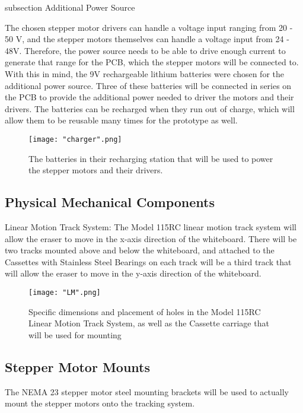 subsection {Additional Power Source}

The chosen stepper motor drivers can handle a voltage input ranging from 20 - 50 V, and the stepper motors themselves can handle a voltage input from 24 - 48V. Therefore, the power source needs to be able to drive enough current to generate that range for the PCB, which the stepper motors will be connected to. With this in mind, the 9V rechargeable lithium batteries were chosen for the additional power source. Three of these batteries will be connected in series on the PCB to provide the additional power needed to driver the motors and their drivers. The batteries can be recharged when they run out of charge, which will allow them to be reusable many times for the prototype as well.

\begin{figure}[H]
	\centering
	{\texttt{[image: "charger".png]}}
	\caption{ The batteries in their recharging station that will be used to power the stepper motors and their drivers.
		\cite{smdataR}}
	\label{fig:charger}
\end{figure}

\subsection{Physical Mechanical Components}

Linear Motion Track System: The Model 115RC linear motion track system will allow the eraser to move in the x-axis direction of the whiteboard. There will be two tracks mounted above and below the whiteboard, and attached to the Cassettes with Stainless Steel Bearings on each track will be a third track that will allow the eraser to move in the y-axis direction of the whiteboard. 

\begin{figure}[H]
	\centering
	{\texttt{[image: "LM".png]}}
	\caption{ Specific dimensions and placement of holes in the Model 115RC Linear Motion Track System, as well as the Cassette carriage that will be used for mounting
		\cite{smdataR}}
	\label{fig:LM}
\end{figure}

\subsection{Stepper Motor Mounts}
The NEMA 23 stepper motor steel mounting brackets will be used to actually mount the stepper motors onto the tracking system.

